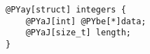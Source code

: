 \begin{Verbatim}[commandchars=@\[\]]
@PYay[struct] integers {
    @PYaJ[int] @PYbe[*]data;
    @PYaJ[size_t] length;
}
\end{Verbatim}
